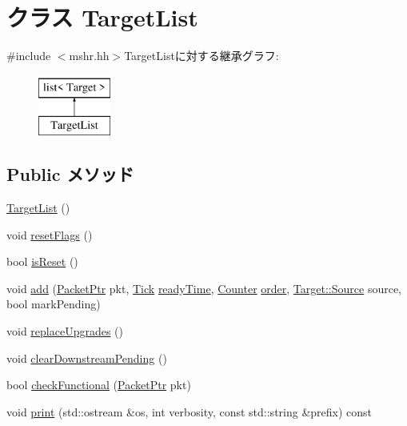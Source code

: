 \hypertarget{classMSHR_1_1TargetList}{
\section{クラス TargetList}
\label{classMSHR_1_1TargetList}
}


{\ttfamily \#include $<$mshr.hh$>$}TargetListに対する継承グラフ:\begin{figure}[H]
\begin{center}
\leavevmode
\includegraphics[height=2cm]{classMSHR_1_1TargetList}
\end{center}
\end{figure}
\subsection*{Public メソッド}
\begin{DoxyCompactItemize}
\item 
\hyperlink{classMSHR_1_1TargetList_aa447a12890c20f5852e14342c550a18d}{TargetList} ()
\item 
void \hyperlink{classMSHR_1_1TargetList_a62735a8af8d77cbab59807d09d9d57df}{resetFlags} ()
\item 
bool \hyperlink{classMSHR_1_1TargetList_a69511868e2e419afd1e46803a3debe28}{isReset} ()
\item 
void \hyperlink{classMSHR_1_1TargetList_af6d681685dd55314bc183bd3305b2a52}{add} (\hyperlink{classPacket}{PacketPtr} pkt, \hyperlink{base_2types_8hh_a5c8ed81b7d238c9083e1037ba6d61643}{Tick} \hyperlink{classMSHR_a7cb362ebfb8750bd53baf5e8f96e00d0}{readyTime}, \hyperlink{base_2types_8hh_ae1475755791765b8e6f6a8bb091e273e}{Counter} \hyperlink{classMSHR_a268baba59d9078c070be7059fd90d9bc}{order}, \hyperlink{classMSHR_1_1Target_a176e1eca2d1e3d1c6a064340bc6a351e}{Target::Source} source, bool markPending)
\item 
void \hyperlink{classMSHR_1_1TargetList_a98242f31aa34a435ca066c5e35413a2c}{replaceUpgrades} ()
\item 
void \hyperlink{classMSHR_1_1TargetList_aba459a1fb9c4f01c1911655c1db0e8e4}{clearDownstreamPending} ()
\item 
bool \hyperlink{classMSHR_1_1TargetList_a8eb60d4744b6212ad749f3a586759266}{checkFunctional} (\hyperlink{classPacket}{PacketPtr} pkt)
\item 
void \hyperlink{classMSHR_1_1TargetList_a5cabeee2cd7415822c9088b27b3b9436}{print} (std::ostream \&os, int verbosity, const std::string \&prefix) const 
\end{DoxyCompactItemize}
